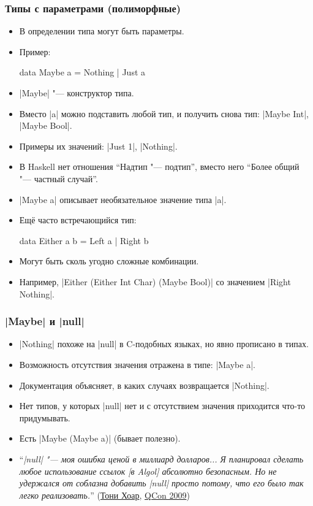 \documentclass[10pt]{beamer}
\begin{document}
\begin{frame}[fragile]
  \frametitle{Типы с параметрами (полиморфные)}
  \begin{itemize}
    \item В определении типа могут быть параметры.
    \item Пример:
          \begin{haskell}
            data Maybe a = Nothing | Just a
          \end{haskell}
    \item \haskinline|Maybe| "--- конструктор типа.
    \item Вместо \haskinline|a| можно подставить любой тип, и получить снова тип: \haskinline|Maybe Int|, \haskinline|Maybe Bool|.
    \item Примеры их значений: \haskinline|Just 1|, \haskinline|Nothing|.
    \item В Haskell нет отношения \enquote{Надтип "--- подтип}, вместо него \enquote{Более общий "--- частный случай}.
    \item \haskinline|Maybe a| описывает необязательное значение типа \haskinline|a|.
          \pause
    \item Ещё часто встречающийся тип:
          \begin{haskell}
            data Either a b = Left a | Right b
          \end{haskell}
    \item Могут быть сколь угодно сложные комбинации.
    \item Например, \haskinline|Either (Either Int Char) (Maybe Bool)| со значением \haskinline|Right Nothing|.
  \end{itemize}
\end{frame}

\begin{frame}[fragile]
  \frametitle{\haskinline|Maybe| и \haskinline|null|}
  \begin{itemize}
    \item \haskinline|Nothing| похоже на \haskinline|null| в C-подобных языках, но явно прописано в типах.
    \item Возможность отсутствия значения отражена в типе: \haskinline|Maybe a|.
    \item Документация объясняет, в каких случаях возвращается \haskinline|Nothing|.
    \item Нет типов, у которых \haskinline|null| нет и с отсутствием значения приходится что-то придумывать.
    \item Есть \haskinline|Maybe (Maybe a)| (бывает полезно).
          \pause
    \item \enquote{\itshape \haskinline|null| "--- моя ошибка ценой в миллиард долларов... Я планировал сделать любое использование ссылок [в Algol] абсолютно безопасным. Но не удержался от соблазна добавить \haskinline|null| просто потому, что его было так легко реализовать.} (\href{https://ru.wikipedia.org/wiki/Хоар,_Чарльз_Энтони_Ричард}{Тони Хоар}, \href{https://www.infoq.com/presentations/Null-References-The-Billion-Dollar-Mistake-Tony-Hoare}{QCon 2009})
  \end{itemize}
\end{frame}
\end{document}
